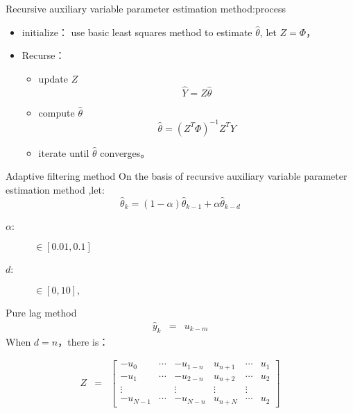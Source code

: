 \begin{frame}{Recursive auxiliary variable parameter estimation method:process}
\begin{itemize}
\item initialize： use basic least squares method to estimate $\hat\theta$, let $Z=\Phi$，
\item  Recurse：
\begin{itemize}
\item update $Z$
$$\hat Y=Z\hat\theta$$
\item compute $\hat\theta$
$$\hat\theta = (Z^T\Phi)^{-1}Z^T Y$$
\item iterate until $\hat\theta$ converges。
\end{itemize}
\end{itemize}
\end{frame}

\begin{frame}{ Adaptive filtering method }
 On the basis of recursive auxiliary variable parameter estimation method ,let:
$$\hat\theta_k=(1-\alpha)\hat\theta_{k-1}+\alpha\hat\theta_{k-d}$$
\begin{description}
\item[$\alpha$:] $\in [0.01,0.1]$
\item[$d$:] $\in [0,10],$
\end{description}
\end{frame}

\begin{frame}{Pure lag method}
\begin{eqnarray*}
\hat y_k &=& u_{k-m}
\end{eqnarray*}
When $d=n$，there is：

\begin{eqnarray*}
Z&=&\begin{bmatrix}
-u_0 & \cdots & -u_{1-n} & u_{n+1} & \cdots & u_1 \\
-u_1 & \cdots & -u_{2-n} & u_{n+2} & \cdots & u_2 \\
\vdots &      & \vdots   &  \vdots &        \vdots \\
-u_{N-1} & \cdots & -u_{N-n} & u_{n+N} & \cdots & u_2 
\end{bmatrix}
\end{eqnarray*}
\end{frame}


